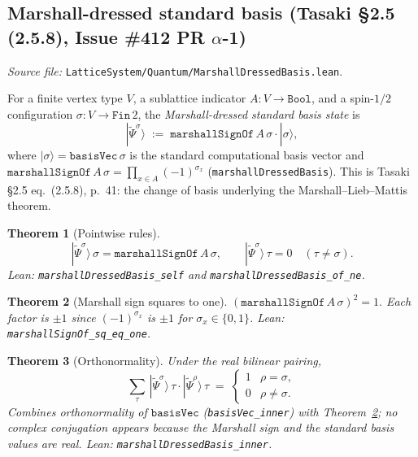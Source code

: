 \documentclass[a4paper,11pt]{article}
\newtheorem{theorem}{Theorem}
\begin{document}
\subsection{Marshall-dressed standard basis (Tasaki §2.5 (2.5.8),
Issue \#412 PR $\alpha$-1)}
\label{ssec:marshall-dressed-basis}

\emph{Source file:}
\texttt{LatticeSystem/Quantum/MarshallDressedBasis.lean}.

For a finite vertex type $V$, a sublattice indicator
$A : V \to \texttt{Bool}$, and a spin-$1/2$ configuration
$\sigma : V \to \texttt{Fin}\,2$, the
\emph{Marshall-dressed standard basis state} is
\[
  |\widetilde{\Psi}^\sigma\rangle
    \;:=\; \texttt{marshallSignOf}\,A\,\sigma \cdot |\sigma\rangle,
\]
where $|\sigma\rangle = \texttt{basisVec}\,\sigma$ is the standard
computational basis vector and
$\texttt{marshallSignOf}\,A\,\sigma = \prod_{x \in A} (-1)^{\sigma_x}$
(\texttt{marshallDressedBasis}).  This is Tasaki §2.5 eq.~(2.5.8),
p.~41: the change of basis underlying the Marshall--Lieb--Mattis
theorem.

\begin{theorem}[Pointwise rules]
\label{thm:marshall-dressed-pointwise}
\[
  |\widetilde{\Psi}^\sigma\rangle\,\sigma
    = \texttt{marshallSignOf}\,A\,\sigma,
\qquad
  |\widetilde{\Psi}^\sigma\rangle\,\tau = 0 \quad (\tau \neq \sigma).
\]
Lean: \texttt{marshallDressedBasis\_self} and
\texttt{marshallDressedBasis\_of\_ne}.
\end{theorem}

\begin{theorem}[Marshall sign squares to one]
\label{thm:marshall-sign-sq}
$(\texttt{marshallSignOf}\,A\,\sigma)^2 = 1.$ Each factor is
$\pm 1$ since $(-1)^{\sigma_x}$ is $\pm 1$ for $\sigma_x \in
\{0, 1\}$.  Lean: \texttt{marshallSignOf\_sq\_eq\_one}.
\end{theorem}

\begin{theorem}[Orthonormality]
\label{thm:marshall-dressed-inner}
Under the real bilinear pairing,
\[
  \sum_\tau\, |\widetilde{\Psi}^\sigma\rangle\,\tau \cdot
    |\widetilde{\Psi}^\rho\rangle\,\tau
    \;=\; \begin{cases} 1 & \rho = \sigma, \\ 0 & \rho \neq \sigma. \end{cases}
\]
Combines orthonormality of $\texttt{basisVec}$
(\texttt{basisVec\_inner}) with
Theorem~\ref{thm:marshall-sign-sq}; no complex conjugation
appears because the Marshall sign and the standard basis values
are real.  Lean: \texttt{marshallDressedBasis\_inner}.
\end{theorem}
\end{document}

